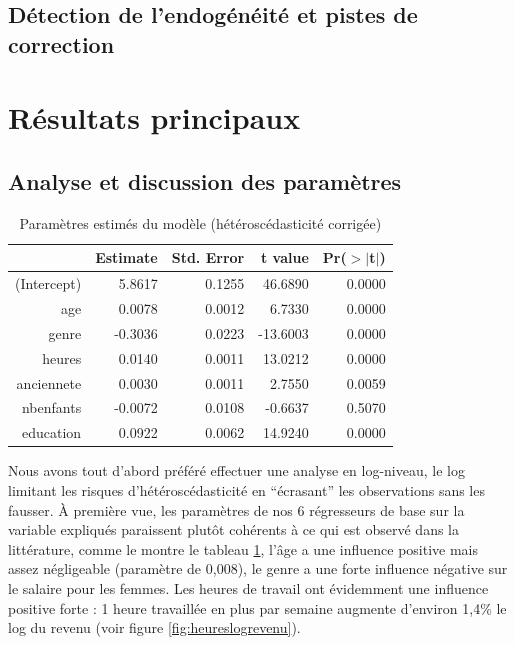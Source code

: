\documentclass[a4paper, french, 11 pt]{article}\usepackage[]{graphicx}\usepackage[]{xcolor}
\begin{document}
\subsection{Détection de l’endogénéité et pistes de correction}

\section{Résultats principaux}

\subsection{Analyse et discussion des paramètres}

\begin{table}[ht]
\centering
\caption{Paramètres estimés du modèle (hétéroscédasticité corrigée)} 
\label{tb:lm1}
\begin{tabular}{rrrrr}
  \toprule
 & Estimate & Std. Error & t value & Pr($>$$|$t$|$) \\ 
  \midrule
(Intercept) & 5.8617 & 0.1255 & 46.6890 & 0.0000 \\ 
  age & 0.0078 & 0.0012 & 6.7330 & 0.0000 \\ 
  genre & -0.3036 & 0.0223 & -13.6003 & 0.0000 \\ 
  heures & 0.0140 & 0.0011 & 13.0212 & 0.0000 \\ 
  anciennete & 0.0030 & 0.0011 & 2.7550 & 0.0059 \\ 
  nbenfants & -0.0072 & 0.0108 & -0.6637 & 0.5070 \\ 
  education & 0.0922 & 0.0062 & 14.9240 & 0.0000 \\ 
   \bottomrule
\end{tabular}
\end{table}




Nous avons tout d’abord préféré effectuer une analyse en log-niveau, le log limitant les risques d’hétéroscédasticité en \enquote{écrasant} les observations sans les fausser. À première vue, les paramètres de nos 6 régresseurs de base sur la variable expliqués paraissent plutôt cohérents à ce qui est observé dans la littérature, comme le montre le tableau \ref{tb:lm1}, l’âge a une influence positive mais assez négligeable (paramètre de 0,008), le genre a une forte influence négative sur le salaire pour les femmes. Les heures de travail ont évidemment une influence positive forte : 1 heure travaillée en plus par semaine augmente d’environ 1,4\% le log du revenu (voir figure \ref{fig:heureslogrevenu}).
\end{document}

